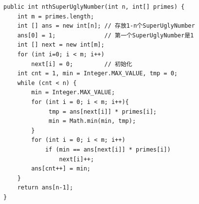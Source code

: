 \documentclass[9pt, b5paaper]{book}
\begin{document}
\begin{verbatim}
public int nthSuperUglyNumber(int n, int[] primes) {
    int m = primes.length;
    int [] ans = new int[n]; // 存放1-n个SuperUglyNumber
    ans[0] = 1;              // 第一个SuperUglyNumber是1
    int [] next = new int[m];
    for (int i=0; i < m; i++)
        next[i] = 0;         // 初始化
    int cnt = 1, min = Integer.MAX_VALUE, tmp = 0;
    while (cnt < n) {
        min = Integer.MAX_VALUE;
        for (int i = 0; i < m; i++){
             tmp = ans[next[i]] * primes[i];
             min = Math.min(min, tmp);
        }
        for (int i = 0; i < m; i++)
            if (min == ans[next[i]] * primes[i])
                next[i]++;
        ans[cnt++] = min;			
    }
    return ans[n-1];		
}
\end{verbatim}
\end{document}
